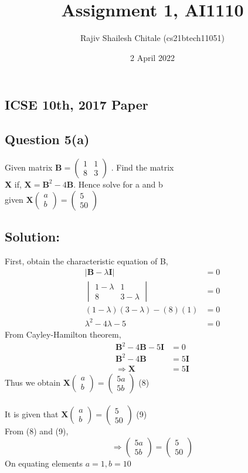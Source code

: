 \documentclass[journal,12pt,twocolumn]{IEEEtran}
\title{Assignment 1, AI1110}
\author{Rajiv Shailesh Chitale (cs21btech11051)}
\date{2 April 2022}
\newcommand{\myvec}[1]{\ensuremath{\begin{pmatrix}#1\end{pmatrix}}}
\newcommand{\mydet}[1]{\ensuremath{\begin{vmatrix}#1\end{vmatrix}}}
\let\vec\mathbf
\begin{document}
\maketitle

\subsection*{\textbf{ICSE 10th, 2017 Paper}}
\subsection*{\textbf{Question 5(a)}}
    Given matrix $\vec{B} = \myvec{ 1 & 1 \\8 & 3}$
    . Find the matrix 
    \\
    \textbf{X} if,  $\vec{X} = \vec{B}^2 -4\vec{B}$. Hence solve for a and b
    \\
    given $\vec{X} \myvec{a \\ b}
    = \myvec{5\\50} $
\subsection*{\textbf{Solution:}}
    First, obtain the characteristic equation of B,
    \begin{align}
        |\vec{B}-\lambda \vec{I}| &= 0 
        \\
        \mydet{1-\lambda & 1\\ 8 & 3-\lambda} &= 0 
        \\
        (1-\lambda)(3-\lambda)-(8)(1) &= 0
        \\
        \lambda ^2 - 4\lambda -5 &= 0
    \end{align}
        From Cayley-Hamilton theorem,
        \begin{align} 
        \vec{B}^2 -4\vec{B} - 5\vec{I} &= 0
        \\
        \vec{B}^2 -4\vec{B} &= 5\vec{I}
        \\
        \Rightarrow \vec{X} &= 5\vec{I}
    \end{align}
    Thus we obtain $\vec{X} \myvec{a \\ b}
    = \myvec{5a \\ 5b} $
    \hfill (8)
    \\
    \\
    It is given that $\vec{X} \myvec{a \\ b}
    = \myvec{5 \\ 50} $
    \hfill (9)
    \\
    From (8) and (9),
    \[ \Rightarrow \myvec{5a \\ 5b}
    =\myvec{5 \\ 50} \]
    On equating elements $a = 1 , b = 10$
    
\end{document}
